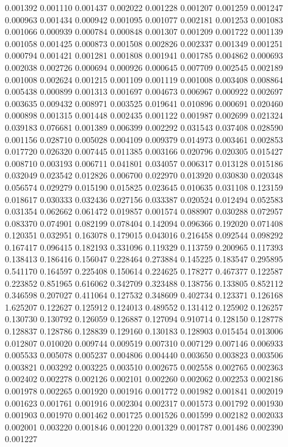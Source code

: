0.001392
0.001110
0.001437
0.002022
0.001228
0.001207
0.001259
0.001247
0.000963
0.001434
0.000942
0.001095
0.001077
0.002181
0.001253
0.001083
0.001066
0.000939
0.000784
0.000848
0.001307
0.001209
0.001722
0.001139
0.001058
0.001425
0.000873
0.001508
0.002826
0.002337
0.001349
0.001251
0.000794
0.001421
0.001281
0.001808
0.001941
0.001785
0.004862
0.000693
0.002038
0.002726
0.000694
0.000926
0.000645
0.007709
0.002545
0.002189
0.001008
0.002624
0.001215
0.001109
0.001119
0.001008
0.003408
0.008864
0.005438
0.000899
0.001313
0.001697
0.004673
0.006967
0.000922
0.002697
0.003635
0.009432
0.008971
0.003525
0.019641
0.010896
0.000691
0.020460
0.000898
0.001315
0.001448
0.002435
0.001122
0.001987
0.002699
0.021324
0.039183
0.076681
0.001389
0.006399
0.002292
0.031543
0.037408
0.028590
0.001156
0.028710
0.005028
0.004109
0.009379
0.014973
0.003461
0.002853
0.017720
0.026320
0.007445
0.011385
0.003166
0.020796
0.020305
0.015427
0.008710
0.003193
0.006711
0.041801
0.034057
0.006317
0.013128
0.015186
0.032049
0.023542
0.012826
0.006700
0.022970
0.013920
0.030830
0.020348
0.056574
0.029279
0.015190
0.015825
0.023645
0.010635
0.031108
0.123159
0.018617
0.030333
0.032436
0.027156
0.033387
0.020524
0.012494
0.052583
0.031354
0.062662
0.061472
0.019857
0.001574
0.088907
0.030288
0.072957
0.083370
0.074901
0.082199
0.078404
0.142094
0.096366
0.192020
0.071408
0.120351
0.032951
0.163078
0.179015
0.043016
0.216458
0.092544
0.098292
0.167417
0.096415
0.182193
0.331096
0.119329
0.113759
0.200965
0.117393
0.138413
0.186416
0.156047
0.228464
0.273884
0.145225
0.183547
0.295895
0.541170
0.164597
0.225408
0.150614
0.224625
0.178277
0.467377
0.122587
0.223852
0.851965
0.616062
0.342709
0.323488
0.138756
0.133805
0.852112
0.346598
0.207027
0.411064
0.127532
0.348609
0.402734
0.123371
0.126168
1.625207
0.122627
0.125912
0.124013
0.489552
0.131412
0.125902
0.126257
0.130730
0.130792
0.126059
0.126887
0.127094
0.910714
0.128150
0.128778
0.128837
0.128786
0.128839
0.129160
0.130183
0.128903
0.015454
0.013006
0.012807
0.010020
0.009744
0.009519
0.007310
0.007129
0.007146
0.006933
0.005533
0.005078
0.005237
0.004806
0.004440
0.003650
0.003823
0.003506
0.003821
0.003292
0.003225
0.003510
0.002675
0.002558
0.002765
0.002363
0.002402
0.002278
0.002126
0.002101
0.002260
0.002062
0.002253
0.002186
0.001978
0.002265
0.001920
0.001916
0.001772
0.001982
0.001841
0.002019
0.001623
0.001761
0.001916
0.002304
0.002317
0.001573
0.001792
0.001930
0.001903
0.001970
0.001462
0.001725
0.001526
0.001599
0.002182
0.002033
0.002001
0.003220
0.001846
0.001220
0.001329
0.001787
0.001486
0.002390
0.001227
